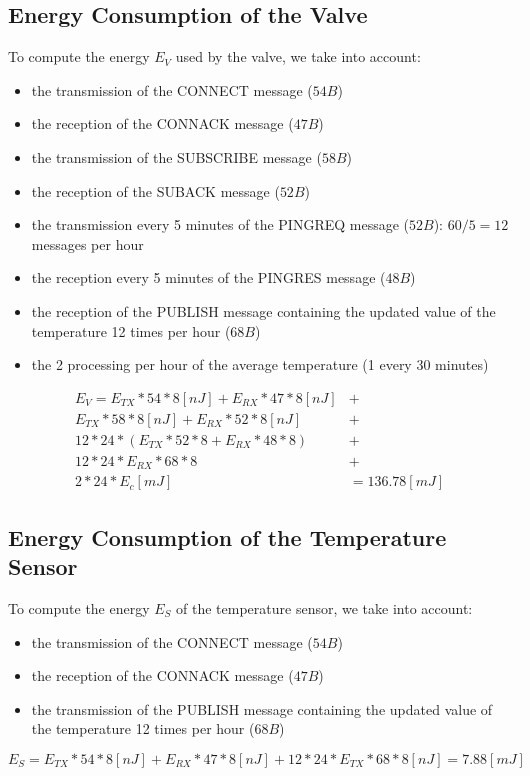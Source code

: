 \documentclass{Configuration_Files/PoliMi3i_thesis}
\begin{document}
\subsection{Energy Consumption of the Valve}
To compute the energy $E_V$ used by the valve, we take into account:
\begin{itemize}
    \item the transmission of the CONNECT message ($54B$)
    \item the reception of the CONNACK message ($47B$)
    \item the transmission of the SUBSCRIBE message ($58B$)
    \item the reception of the SUBACK message ($52B$)
    \item the transmission every 5 minutes of the PINGREQ message ($52B$): $60/5=12$ messages per hour
    \item the reception every 5 minutes of the PINGRES message ($48B$)
    \item the reception of the PUBLISH message containing the updated value of the temperature 12 times per hour ($68B$)
    \item the 2 processing per hour of the average temperature (1 every 30 minutes)
\end{itemize}

\begin{equation}
 \begin{aligned}
    E_{V} = E_{TX}*54*8 [nJ] + E_{RX}*47*8 [nJ] &+ \\
    E_{TX}*58*8 [nJ] + E_{RX}*52*8 [nJ] &+ \\
    12*24*(E_{TX}*52*8 + E_{RX}*48*8) &+ \\
    12*24*E_{RX}*68*8 &+ \\
    2*24*E_c [mJ] &= 136.78 [mJ]
 \end{aligned}
\end{equation}

\subsection{Energy Consumption of the Temperature Sensor}
To compute the energy $E_S$ of the temperature sensor, we take into account:
\begin{itemize}
    \item the transmission of the CONNECT message ($54B$)
    \item the reception of the CONNACK message ($47B$)
    \item the transmission of the PUBLISH message containing the updated value of the temperature 12 times per hour ($68B$)
\end{itemize}
\begin{equation}
    E_S = E_{TX}*54*8 [nJ] + E_{RX}*47*8 [nJ] + 12*24*E_{TX}*68*8 [nJ] = 7.88 [mJ]
\end{equation}
\end{document}
